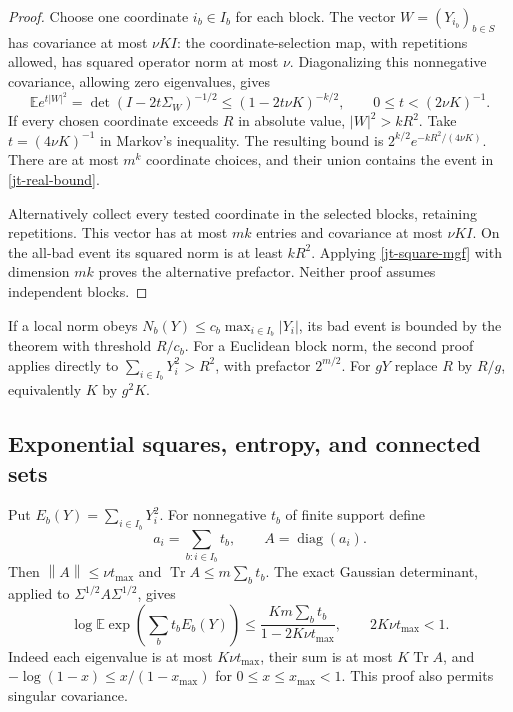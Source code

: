 \documentclass[11pt]{article}
\theoremstyle{remark}
\newcommand{\norm}[1]{\left\|#1\right\|}
\begin{document}
\begin{proof}
Choose one coordinate $i_b\in I_b$ for each block. The vector
$W=(Y_{i_b})_{b\in S}$ has covariance at most $\nu K I$:
the coordinate-selection map, with repetitions allowed, has
squared operator norm at most $\nu$. Diagonalizing this
nonnegative covariance, allowing zero eigenvalues, gives
\begin{equation}\label{jt-square-mgf}
 \mathbb E e^{t|W|^2}
 =\det(I-2t\Sigma_W)^{-1/2}
 \le(1-2t\nu K)^{-k/2},\qquad 0\le t<(2\nu K)^{-1}.
\end{equation}
If every chosen coordinate exceeds $R$ in absolute value,
$|W|^2>kR^2$. Take $t=(4\nu K)^{-1}$ in Markov's inequality.
The resulting bound is $2^{k/2}e^{-kR^2/(4\nu K)}$.
There are at most $m^k$ coordinate choices, and their union
contains the event in \eqref{jt-real-bound}.

Alternatively collect every tested coordinate in the selected
blocks, retaining repetitions. This vector has at most $mk$
entries and covariance at most $\nu K I$. On the all-bad event
its squared norm is at least $kR^2$. Applying
\eqref{jt-square-mgf} with dimension $mk$ proves the alternative
prefactor. Neither proof assumes independent blocks.
\end{proof}

If a local norm obeys
$N_b(Y)\le c_b\max_{i\in I_b}|Y_i|$, its bad event is
bounded by the theorem with threshold $R/c_b$. For a Euclidean
block norm, the second proof applies directly to
$\sum_{i\in I_b}Y_i^2>R^2$, with prefactor $2^{m/2}$.
For $gY$ replace $R$ by $R/g$, equivalently $K$ by $g^2K$.

\subsection{Exponential squares, entropy, and connected sets}
\label{jt-entropy-section}

Put $E_b(Y)=\sum_{i\in I_b}Y_i^2$. For nonnegative $t_b$ of
finite support define
\[
 a_i=\sum_{b:i\in I_b}t_b,\qquad A=\operatorname{diag}(a_i).
\]
Then $\norm A\le\nu t_{\max}$ and
$\operatorname{Tr}A\le m\sum_b t_b$. The exact Gaussian
determinant, applied to $\Sigma^{1/2}A\Sigma^{1/2}$, gives
\begin{equation}\label{jt-exponential-square}
 \boxed{\quad
 \log\mathbb E\exp\!\left(\sum_b t_bE_b(Y)\right)
 \le\frac{Km\sum_b t_b}{1-2K\nu t_{\max}},
 \qquad 2K\nu t_{\max}<1.
 \quad}
\end{equation}
Indeed each eigenvalue is at most $K\nu t_{\max}$, their
sum is at most $K\operatorname{Tr}A$, and
$-\log(1-x)\le x/(1-x_{\max})$ for $0\le x\le x_{\max}<1$.
This proof also permits singular covariance.
\end{document}
